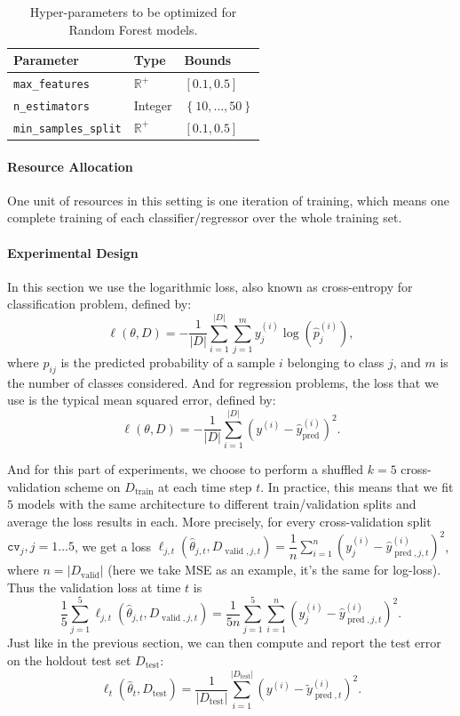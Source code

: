 \documentclass[twoside,11pt]{article}
\begin{document}
\begin{table}[ht]
\centering
\begin{tabular}{@{}lll@{}}
\toprule
\textbf{Parameter}             & \textbf{Type}  & \textbf{Bounds}                          \\ \midrule
\texttt{max\_features}      & $\mathbb{R}^+$ & $\left[0.1, 0.5\right]$   \\
\texttt{n\_estimators}          & Integer        & $\left\lbrace 10, \dots, 50 \right\rbrace$ \\
\texttt{min\_samples\_split}  & $\mathbb{R}^+$  & $\left[0.1, 0.5\right]$
\end{tabular}
\caption{Hyper-parameters to be optimized for Random Forest models.}
\label{rfparam}
\end{table}

\paragraph{\textbf{Resource Allocation}} One unit of resources in this setting is one iteration of training, which means one complete training of each classifier/regressor over the whole training set.

\paragraph{\textbf{Experimental Design}} In this section we use the logarithmic loss, also known as cross-entropy for classification problem, defined by:
\[
\ell(\theta, D) = - \frac{1}{|D|} \sum_{i=1}^{|D|} \sum_{j=1}^m y^{(i)}_{j}\log(\hat{p}^{(i)}_{j}),
\]
where $\hat{p}_{ij}$ is the predicted probability of a sample $i$ belonging to class $j$, and $m$ is the number of classes considered. And for regression problems, the loss that we use is the typical mean squared error, defined by:
\[
\ell(\theta, D) = - \frac{1}{|D|} \sum_{i=1}^{|D|} \left(y^{(i)} - \hat{y}^{(i)}_{\operatorname{pred}}\right)^2.
\]

And for this part of experiments, we choose to perform a shuffled $k=5$ cross-validation scheme on $D_{\operatorname{train}}$ at each time step $t$. In practice, this means that we fit $5$ models with the same architecture to different train/validation splits and average the loss results in each. More precisely, for every cross-validation split
$\mathtt{cv}_j,j=1\ldots5$, we get a loss $\ell_{j,t}(\hat{\theta}_{j,t}, D_{\operatorname{valid},j,t}) = \dfrac{1}{n} \sum^{n}_{i=1} \left(y^{(i)}_{j} - \hat{y}^{(i)}_{\operatorname{pred},j,t}\right)^2$, where $n=|D_{\operatorname{valid}}|$ (here we take MSE as an example, it's the same for log-loss). Thus the validation loss at time $t$ is
\[
\frac{1}{5}\sum_{j=1}^{5}\ell_{j,t}(\hat{\theta}_{j,t}, D_{\operatorname{valid},j,t}) = \frac{1}{5n}\sum_{j=1}^{5} \sum_{i=1}^n \left(y^{(i)}_{j} - \hat{y}^{(i)}_{\operatorname{pred},j,t}\right)^2.
\]
Just like in the previous section, we can then compute and report the test error on the holdout test set $D_{\operatorname{test}}$:
\[
\ell_{t}(\hat{\theta}_t, D_{\operatorname{test}}) = \frac{1}{|D_{\operatorname{test}}|} \sum_{i=1}^{|D_{\operatorname{test}}|} \left(y^{(i)} - \tilde{y}^{(i)}_{\operatorname{pred},t}\right)^2.
\]
\end{document}
